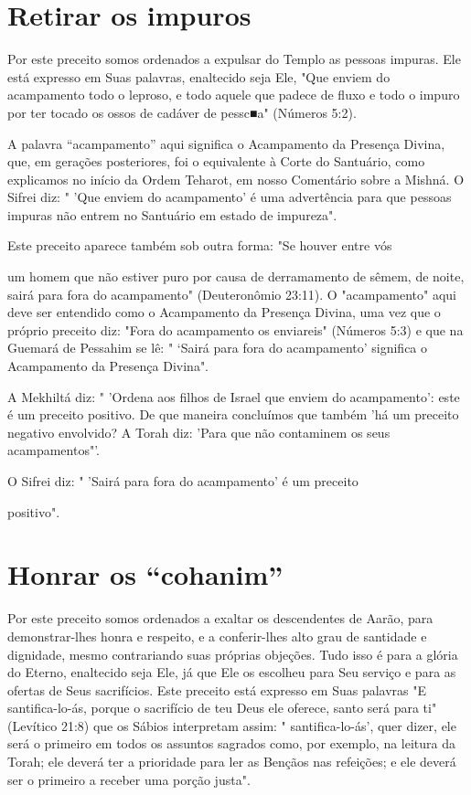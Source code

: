 \section{Retirar os impuros}

Por este preceito somos ordenados a expulsar do Templo as pessoas
impuras. Ele está expresso em Suas palavras, enaltecido seja Ele, "Que
enviem do acampamento todo o leproso, e todo aquele que padece de fluxo
e todo o impuro por ter tocado os ossos de cadáver de pessc■a" (Números
5:2).

A palavra ``acampamento'' aqui significa o Acampamento da Presen­ça
Divina, que, em gerações posteriores, foi o equivalente à Corte do
Santuá­rio, como explicamos no início da Ordem Teharot, em nosso
Comentário so­bre a Mishná. O Sifrei diz: " 'Que enviem do acampamento'
é uma advertência para que pessoas impuras não entrem no Santuário em
estado de impureza".


Este preceito aparece também sob outra forma: "Se houver entre vós

um homem que não estiver puro por causa de derramamento de sêmem, de
noite, sairá para fora do acampamento" (Deuteronômio 23:11). O
"acampamen­to" aqui deve ser entendido como o Acampamento da Presença
Divina, uma vez que o próprio preceito diz: "Fora do acampamento os
enviareis" (Núme­ros 5:3) e que na Guemará de Pessahim se lê: " `Sairá
para fora do acampamen­to' significa o Acampamento da Presença Divina".

A Mekhiltá diz: " 'Ordena aos filhos de Israel que enviem do
acam­pamento': este é um preceito positivo. De que maneira concluímos
que tam­bém 'há um preceito negativo envolvido? A Torah diz: 'Para que
não contami­nem os seus acampamentos"'.


O Sifrei diz: " 'Sairá para fora do acampamento' é um preceito


positivo".

\section{Honrar os ``cohanim''}

Por este preceito somos ordenados a exaltar os descendentes de Aa­rão,
para demonstrar-lhes honra e respeito, e a conferir-lhes alto grau de
santi­dade e dignidade, mesmo contrariando suas próprias objeções. Tudo
isso é pa­ra a glória do Eterno, enaltecido seja Ele, já que Ele os
escolheu para Seu servi­ço e para as ofertas de Seus sacrifícios. Este
preceito está expresso em Suas pa­lavras "E santifica-lo-ás, porque o
sacrifício de teu Deus ele oferece, santo será para ti" (Levítico 21:8)
que os Sábios interpretam assim: " santifica-lo-ás', quer dizer, ele
será o primeiro em todos os assuntos sagrados como, por exemplo, na
leitura da Torah; ele deverá ter a prioridade para ler as Bençãos nas
refei­ções; e ele deverá ser o primeiro a receber uma porção justa".

